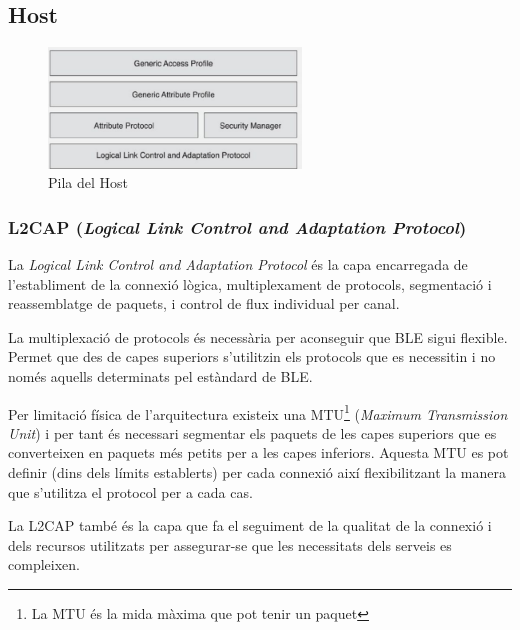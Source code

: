 
\subsection{Host}
	\begin{figure}[h!]
		\begin{center}
			\includegraphics[width=0.6\textwidth]{./images/host.png}
			\caption{Pila del Host}
	\end{center}
\end{figure}

\subsubsection{L2CAP (\textit{Logical Link Control and Adaptation Protocol})}
La \textit{Logical Link Control and Adaptation Protocol} és la capa encarregada de l'establiment de la connexió lògica, multiplexament de protocols, segmentació i reassemblatge de paquets, i control de flux individual per canal.

La multiplexació de protocols és necessària per aconseguir que BLE sigui flexible.
Permet que des de capes superiors s'utilitzin els protocols que es necessitin i no només aquells determinats pel estàndard de BLE.

Per limitació física de l'arquitectura existeix una MTU\footnote{La MTU és la mida màxima que pot tenir un paquet} (\textit{Maximum Transmission Unit}) i per tant és necessari segmentar els paquets de les capes superiors que es converteixen en paquets més petits per a les capes inferiors.
Aquesta MTU es pot definir (dins dels límits establerts) per cada connexió així flexibilitzant la manera que s'utilitza el protocol per a cada cas.

La L2CAP també és la capa que fa el seguiment de la qualitat de la connexió i dels recursos utilitzats per assegurar-se que les necessitats dels serveis es compleixen.

